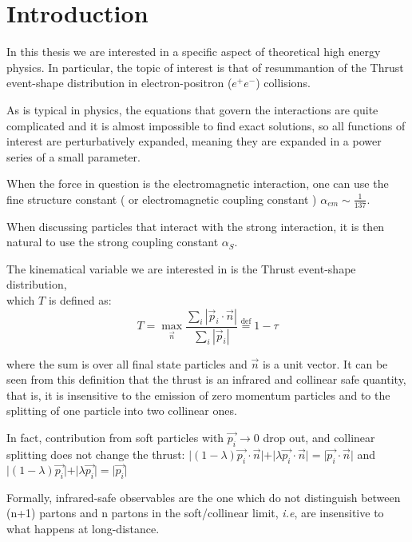 \documentclass[../main.tex]{subfiles}
\begin{document}
\section{Introduction}

In this thesis we are interested in a specific aspect of theoretical high energy physics. In particular,
the topic of interest is that of resummantion of the Thrust event-shape distribution in electron-positron ($e^+e^-$) collisions.

As is typical in physics, the equations that govern the interactions are quite complicated and it is almost impossible to find exact solutions, so all
functions of interest are perturbatively expanded, meaning they are expanded in a power series of a small parameter. 

When the force in question is the electromagnetic interaction, one can
use the fine structure constant ( or electromagnetic coupling constant ) $\alpha_{em} \sim \frac{1}{137} $.

When discussing particles that interact with the strong interaction, it is then natural to use the strong
coupling constant $ \alpha_S $.

The kinematical variable we are interested in is the Thrust event-shape distribution, \\
which $T$ is defined as:
\begin{equation} \label{eq:Thrust}
    T = \max_{\vec{n}} \frac{\sum_i |\vec{p}_i \cdot \vec{n}|}{\sum_i |\vec{p}_i|} \stackrel{\text{def}}{=} 1-\tau
\end{equation}

where the sum is over all final state particles and $\vec{n}$ is a unit vector.
It can be seen from this definition that the thrust is an infrared and collinear safe
quantity, that is, it is insensitive to the emission of zero momentum particles and to the splitting of 
one particle into two collinear ones.

In fact, contribution from soft particles with $\vec{p_i}\to 0$ drop out, and collinear splitting does not change the thrust:
$\vert (1-\lambda)\vec{p_i}\cdot \vec{n} \vert + \vert \lambda \vec{p_i}\cdot \vec{n}\vert = \vert \vec{p_i}\cdot \vec{n} \vert$ and 
$\vert (1-\lambda)\vec{p_i} \vert + \vert \lambda \vec{p_i}\vert = \vert \vec{p_i} \vert$

Formally, infrared-safe observables are the one which do not distinguish between (n+1) partons and n partons in the soft/collinear limit, \emph{i.e},
are insensitive to what happens at long-distance.
\end{document}
